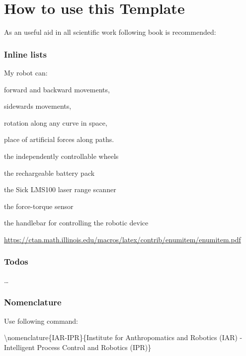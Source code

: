 \chapter{How to use this Template}
\label{sec:how-to-use}

As an useful aid in all scientific work following book is recommended: \cite{deininger2005studien}


\subsection{Inline lists}
My robot can:
\begin{enumerate*}[label=(\roman*)]
 \item forward and backward movements,
 \item sidewards movements,
 \item rotation along any curve in space,
 \item place of artificial forces along paths.
\end{enumerate*}

\begin{enumerate*}[label=(\arabic*),itemjoin={{; }}]
    \item the independently controllable wheels
    \item the rechargeable battery pack
    \item the Sick LMS100 laser range scanner
    \item the force-torque sensor
    \item the handlebar for controlling the robotic device
\end{enumerate*}

\url{https://ctan.math.illinois.edu/macros/latex/contrib/enumitem/enumitem.pdf}

\subsection{Todos}

\dots
{}

\subsection{Nomenclature}
Use following command:

\textbackslash nomenclature\{IAR-IPR\}\{Institute for Anthropomatics and Robotics (IAR) - Intelligent Process Control and Robotics (IPR)\}

